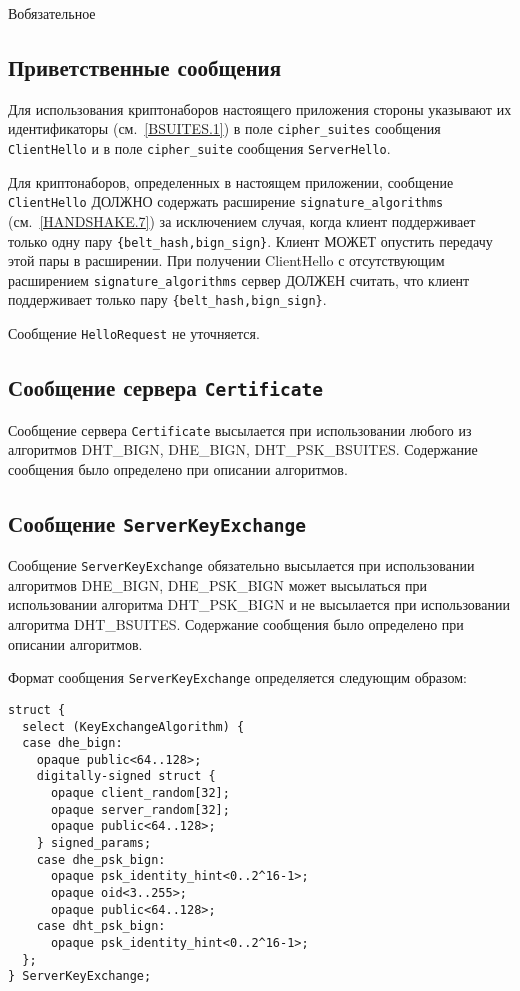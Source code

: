 \begin{appendix}{В}{обязательное}
\subsection{Приветственные сообщения}\label{BSUITES.4.2}

Для использования криптонаборов настоящего приложения стороны указывают их
идентификаторы (см.~\ref{BSUITES.1}) в поле \lstinline{cipher_suites}
сообщения \lstinline{ClientHello} и в поле \lstinline{cipher_suite}
сообщения \lstinline{ServerHello}.

Для криптонаборов, определенных в настоящем приложении, сообщение
\lstinline{ClientHello} ДОЛЖНО содержать расширение
\lstinline{signature_algorithms} (см.~\ref{HANDSHAKE.7}) за исключением
случая, когда клиент поддерживает только одну пару
\lstinline|{belt_hash,bign_sign}|. Клиент МОЖЕТ опустить передачу этой пары
в расширении. При получении ClientHello с отсутствующим расширением
\lstinline{signature_algorithms} сервер ДОЛЖЕН считать, что клиент
поддерживает только пару \lstinline|{belt_hash,bign_sign}|.

Сообщение \lstinline{HelloRequest} не уточняется.

\subsection{Сообщение сервера \lstinline{Certificate}}\label{BSUITES.4.3}

Сообщение сервера \lstinline{Certificate} высылается при использовании любого из 
алгоритмов DHT\_BIGN, DHE\_BIGN, DHT\_PSK\_BSUITES. Содержание сообщения было 
определено при описании алгоритмов. 

\subsection{Сообщение \lstinline{ServerKeyExchange}}\label{BSUITES.4.4}

Сообщение \lstinline{ServerKeyExchange} обязательно высылается при использовании 
алгоритмов DHE\_BIGN, DHE\_PSK\_BIGN может высылаться при использовании 
алгоритма DHT\_PSK\_BIGN и не высылается при использовании алгоритма 
DHT\_BSUITES. Содержание сообщения было определено при описании алгоритмов. 

Формат сообщения \lstinline{ServerKeyExchange} определяется следующим образом:
\begin{lstlisting}
struct {
  select (KeyExchangeAlgorithm) {
  case dhe_bign:
    opaque public<64..128>;
    digitally-signed struct {
      opaque client_random[32];
      opaque server_random[32];
      opaque public<64..128>;
    } signed_params;
    case dhe_psk_bign:
      opaque psk_identity_hint<0..2^16-1>;
      opaque oid<3..255>;
      opaque public<64..128>;
    case dht_psk_bign:
      opaque psk_identity_hint<0..2^16-1>;
  };
} ServerKeyExchange;
\end{lstlisting}


\end{appendix}
